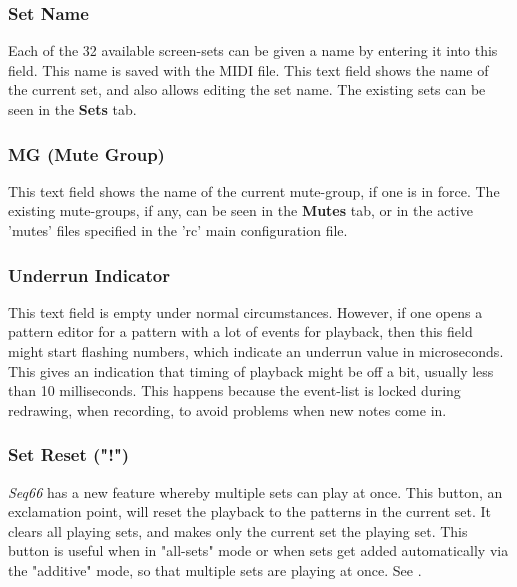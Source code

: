 \subsubsection{Set Name}
\label{subsubsec:introduction_mg}

   Each of the 32 available screen-sets can be given a name by entering it
   into this field.  This name is saved with the MIDI file.
   This text field shows the name of the current set, and also allows editing
   the set name.
   The existing sets can be seen in the \textbf{Sets} tab.

\subsubsection{MG (Mute Group)}
\label{subsubsec:introduction_mute_group}

   This text field shows the name of the current mute-group, if one is
   in force. The existing mute-groups, if any, can be seen in the
   \textbf{Mutes} tab, or in the active 'mutes' files specified in the
   'rc' main configuration file.

\subsubsection{Underrun Indicator}
\label{subsubsec:introduction_underrun_indicator}

   This text field is empty under normal circumstances.
   However, if one opens a pattern editor for a pattern with a lot
   of events for playback, then this field might
   start flashing numbers, which indicate an
    underrun value in microseconds.  This gives an indication that
   timing of playback might be off a bit, usually less than 10 milliseconds.
   This happens because the event-list is locked during redrawing,
   when recording, to avoid problems when new notes come in.

\subsubsection{Set Reset ("!")}
\label{subsubsec:introduction_set_reset}

   \textsl{Seq66} has a new feature whereby multiple sets can play at once.
   This button, an exclamation point, will reset the playback to the patterns
   in the current set.
   It clears all playing sets, and makes only the current set the playing set.
   This button is useful when in "all-sets" mode or when sets get added
   automatically via the "additive" mode, so that multiple sets are playing
   at once.
   See .

